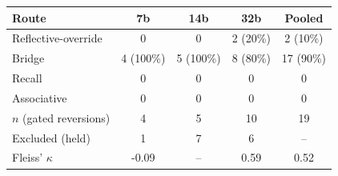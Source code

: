 \begin{tabular}{lcccc}
\toprule
Route & 7b & 14b & 32b & Pooled \\
\midrule
Reflective-override & 0 & 0 & 2 (20\%) & 2 (10\%) \\
Bridge & 4 (100\%) & 5 (100\%) & 8 (80\%) & 17 (90\%) \\
Recall & 0 & 0 & 0 & 0 \\
Associative & 0 & 0 & 0 & 0 \\
\midrule
$n$ (gated reversions) & 4 & 5 & 10 & 19 \\
Excluded (held) & 1 & 7 & 6 & -- \\
Fleiss' $\kappa$ & -0.09 & -- & 0.59 & 0.52 \\
\bottomrule
\end{tabular}